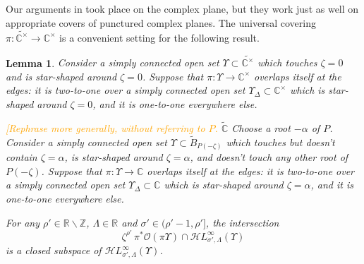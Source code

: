 \documentclass{article}
\newcommand{\singexp}[2]{\mathcal{H}L^\infty_{#1, #2}}
\newcommand{\maps}{\colon}
\newcommand{\Z}{\mathbb{Z}}
\newcommand{\R}{\mathbb{R}}
\newcommand{\C}{\mathbb{C}}
\theoremstyle{definition}
\theoremstyle{plain}
\newtheorem{lemma}[definition]{Lemma}
\begin{document}
\color{BlueViolet}
Our arguments in \cite{reg-sing-volterra} took place on the complex plane, but they work just as well on appropriate covers of punctured complex planes. The universal covering $\pi \maps \widetilde{\C^\times} \to \C^\times$ is a convenient setting for the following result.
\begin{lemma}\label{lem:shifted_holo_closed}
Consider a simply connected open set $\Upsilon \subset \widetilde{\C^\times}$ which touches $\zeta = 0$ and is star-shaped around $\zeta = 0$. Suppose that $\pi \maps \Upsilon \to \C^\times$ overlaps itself at the edges: it is two-to-one over a simply connected open set $\Upsilon_\Delta \subset \C^\times$ which is star-shaped around $\zeta = 0$, and it is one-to-one everywhere else.

\color{RoyalBlue}\textcolor{orange}{[Rephrase more generally, without referring to $P$.} 
$\tilde{\C}$
Choose a root $-\alpha$ of $P$. Consider a simply connected open set $\Upsilon \subset \widetilde{B}_{P(-\zeta)}$ which touches but doesn't contain $\zeta = \alpha$, is star-shaped around $\zeta = \alpha$, and doesn't touch any other root of $P(-\zeta)$. Suppose that $\pi \maps \Upsilon \to \C$ overlaps itself at the edges: it is two-to-one over a simply connected open set $\Upsilon_\Delta \subset \C$ which is star-shaped around $\zeta = \alpha$, and it is one-to-one everywhere else.
\color{BlueViolet}
\begin{center}
\end{center}
For any $\rho' \in \R \smallsetminus \Z$, $\Lambda \in \R$ and $\sigma' \in (\rho'-1, \rho']$, the intersection
\[ \zeta^{\rho'}\,\pi^*\mathcal{O}(\pi \Upsilon) \cap \singexp{\sigma'}{\Lambda}(\Upsilon) \]
is a closed subspace of $\singexp{\sigma'}{\Lambda}(\Upsilon)$.
\end{lemma}
\end{document}
